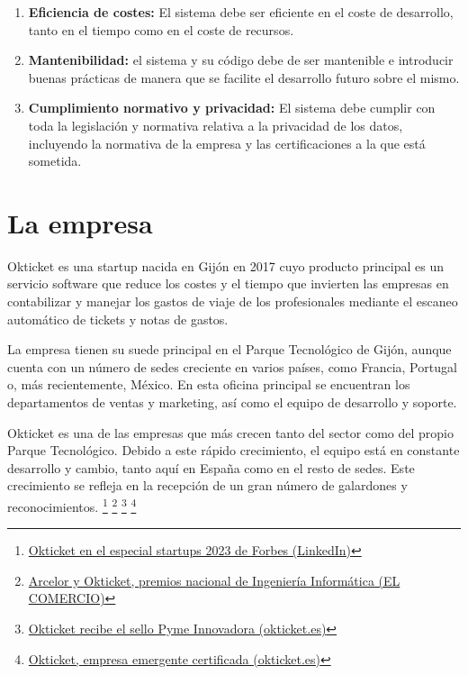 \begin{enumerate}[label=RNF\arabic*.]
\begin{enumerate}[label*=\arabic*.]
	\end{enumerate}
	\item \textbf{Eficiencia de costes:} El sistema debe ser eficiente en el coste de desarrollo, tanto en el tiempo como en el coste de
		recursos.
	\item \textbf{Mantenibilidad:} el sistema y su código debe de ser mantenible e introducir buenas prácticas de manera
		que se facilite el desarrollo futuro sobre el mismo.
	\item \textbf{Cumplimiento normativo y privacidad:} El sistema debe cumplir con toda la legislación y normativa
		relativa a la privacidad de los datos, incluyendo la normativa de la empresa y las certificaciones a la que
		está sometida.
\end{enumerate}

\newpage{}
\section{La empresa}\label{sec:empresa}
Okticket es una startup nacida en Gijón en 2017 cuyo producto principal es un servicio software
que reduce los costes y el tiempo que invierten las empresas en contabilizar y manejar los gastos
de viaje de los profesionales mediante el escaneo automático de tickets y notas de gastos.

La empresa tienen su suede principal  en el Parque Tecnológico de Gijón, aunque cuenta con un número
de sedes creciente en varios países, como Francia, Portugal o, más recientemente, México. En esta
oficina principal se encuentran los departamentos de ventas y marketing, así como el equipo de
desarrollo y soporte.

Okticket es una de las empresas que más crecen tanto del sector como del propio Parque
Tecnológico. Debido a este rápido crecimiento, el equipo está en constante desarrollo y
cambio, tanto aquí en España como en el resto de sedes. Este crecimiento se refleja
en la recepción de un gran número de galardones y reconocimientos.
\footnote{\href{https://www.linkedin.com/posts/okticket_okticket-en-el-especial-startups-de-forbes-activity-7140622980618903552-UGWK}{Okticket en el especial startups 2023 de Forbes (LinkedIn)}}
\footnote{\href{https://www.elcomercio.es/economia/arcelor-okticket-premios-20230222002438-ntvo.html}{Arcelor y Okticket, premios nacional de Ingeniería Informática (EL COMERCIO)}}
\footnote{\href{https://www.okticket.es/blog/empresa-pyme-innovadora}{Okticket recibe el sello Pyme Innovadora (okticket.es)}}
\footnote{\href{https://www.okticket.es/blog/okticket-empresa-emergente-certificada}{Okticket, empresa emergente certificada (okticket.es)}}

